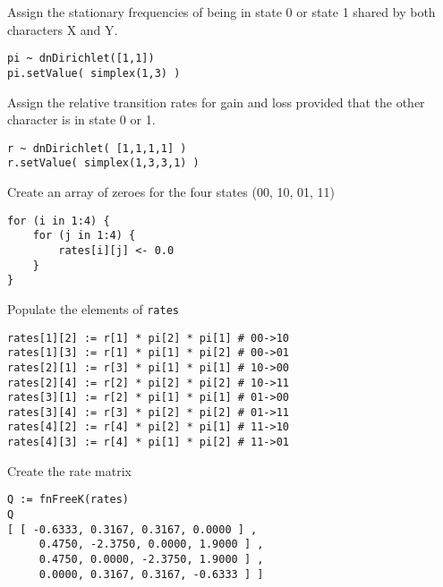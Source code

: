 Assign the stationary frequencies of being in state 0 or state 1 shared by both characters X and Y.

{\tt \begin{snugshade*}
\begin{lstlisting}
pi ~ dnDirichlet([1,1])
pi.setValue( simplex(1,3) )
\end{lstlisting}
\end{snugshade*}}

Assign the relative transition rates for gain and loss provided that the other character is in state 0 or 1.

{\tt \begin{snugshade*}
\begin{lstlisting}
r ~ dnDirichlet( [1,1,1,1] )
r.setValue( simplex(1,3,3,1) )
\end{lstlisting}
\end{snugshade*}}

Create an array of zeroes for the four states (00, 10, 01, 11)

{\tt \begin{snugshade*}
\begin{lstlisting}
for (i in 1:4) {
    for (j in 1:4) {
        rates[i][j] <- 0.0
    }
}
\end{lstlisting}
\end{snugshade*}}

Populate the elements of {\tt rates}

{\tt \begin{snugshade*}
\begin{lstlisting}
rates[1][2] := r[1] * pi[2] * pi[1] # 00->10
rates[1][3] := r[1] * pi[1] * pi[2] # 00->01
rates[2][1] := r[3] * pi[1] * pi[1] # 10->00
rates[2][4] := r[2] * pi[2] * pi[2] # 10->11
rates[3][1] := r[2] * pi[1] * pi[1] # 01->00
rates[3][4] := r[3] * pi[2] * pi[2] # 01->11
rates[4][2] := r[4] * pi[2] * pi[1] # 11->10
rates[4][3] := r[4] * pi[1] * pi[2] # 11->01
\end{lstlisting}
\end{snugshade*}}

Create the rate matrix

{\tt \begin{snugshade*}
\begin{lstlisting}
Q := fnFreeK(rates)
Q
[ [ -0.6333, 0.3167, 0.3167, 0.0000 ] ,
     0.4750, -2.3750, 0.0000, 1.9000 ] ,
     0.4750, 0.0000, -2.3750, 1.9000 ] ,
     0.0000, 0.3167, 0.3167, -0.6333 ] ]
\end{lstlisting}
\end{snugshade*}}

